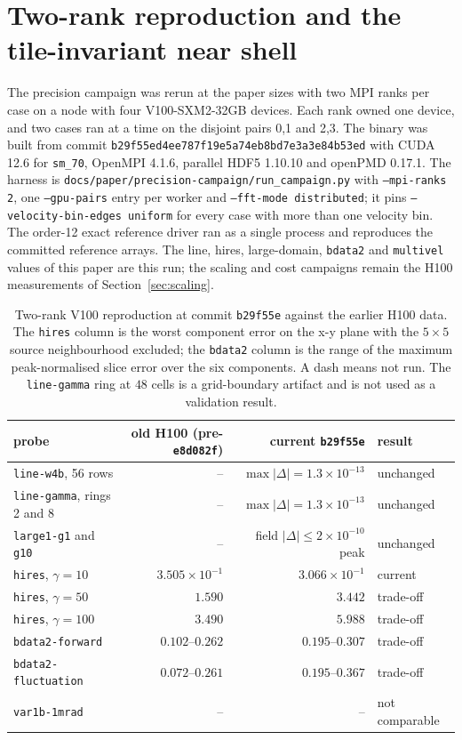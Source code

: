 \section{Two-rank reproduction and the tile-invariant near shell}
\label{app:reproduction}

The precision campaign was rerun at the paper sizes with two MPI ranks per
case on a node with four V100-SXM2-32GB devices.  Each rank owned one device,
and two cases ran at a time on the disjoint pairs 0,1 and 2,3.  The binary was
built from commit \texttt{b29f55ed4ee787f19e5a74eb8bd7e3a3e84b53ed} with CUDA
12.6 for \texttt{sm\_70}, OpenMPI 4.1.6, parallel HDF5 1.10.10 and openPMD
0.17.1.  The harness is
\texttt{docs/paper/precision-campaign/run\_campaign.py} with
\texttt{--mpi-ranks 2}, one \texttt{--gpu-pairs} entry per worker and
\texttt{--fft-mode distributed}; it pins \texttt{--velocity-bin-edges uniform}
for every case with more than one velocity bin.  The order-12 exact reference
driver ran as a single process and reproduces the committed reference arrays.
The line, hires, large-domain, \texttt{bdata2} and \texttt{multivel} values of
this paper are this run; the scaling and cost campaigns remain the H100
measurements of Section~\ref{sec:scaling}.

\begin{table}[t]
\centering
\small
\caption{Two-rank V100 reproduction at commit \texttt{b29f55e} against the
earlier H100 data.  The \texttt{hires} column is the worst component error on
the x-y plane with the $5\times5$ source neighbourhood excluded; the
\texttt{bdata2} column is the range of the maximum peak-normalised slice
error over the six components.  A dash means not run.  The
\texttt{line-gamma} ring at $48$ cells is a grid-boundary artifact and is not
used as a validation result.}
\label{tab:reproduction}
\begin{tabular}{lrrl}
\toprule
probe & old H100 (pre-\texttt{e8d082f}) & current \texttt{b29f55e} & result \\
\midrule
\texttt{line-w4b}, 56 rows & -- & $\max|\Delta|=1.3\times10^{-13}$ & unchanged \\
\texttt{line-gamma}, rings 2 and 8 & -- & $\max|\Delta|=1.3\times10^{-13}$ & unchanged \\
\texttt{large1-g1} and \texttt{g10} & -- & field $|\Delta|\le2\times10^{-10}$ peak & unchanged \\
\texttt{hires}, $\gamma=10$ & $3.505\times10^{-1}$ & $3.066\times10^{-1}$ & current \\
\texttt{hires}, $\gamma=50$ & $1.590$ & $3.442$ & trade-off \\
\texttt{hires}, $\gamma=100$ & $3.490$ & $5.988$ & trade-off \\
\texttt{bdata2-forward} & $0.102$--$0.262$ & $0.195$--$0.307$ & trade-off \\
\texttt{bdata2-fluctuation} & $0.072$--$0.261$ & $0.195$--$0.367$ & trade-off \\
\texttt{var1b-1mrad} & -- & -- & not comparable \\
\bottomrule
\end{tabular}
\end{table}

